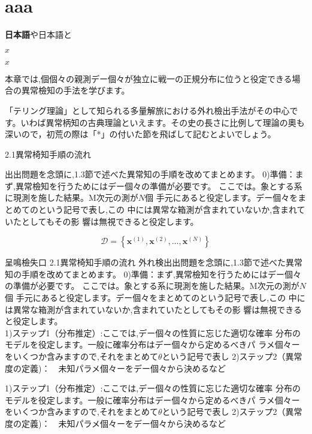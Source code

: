\documentclass{jarticle}
\begin{document}
\section{aaa}

\textbf{日本語}や{\Huge 日本語}と



\( x \)

$x$

\centering \Huge

本章では,個個々の親測デー個々が独立に戦一の正規分布に位うと役定できる場合の異常檢知の手法を学びます。

「テリング理論」として知られる多量解旅における外れ檢出手法がその中心です。いわば異常柄知の古典理論といえます。その史の長さに比例して理論の奧も深いので，初荒の際は「*」の付いた節を飛ばして記むとよいでしょう。


2.1異常椅知手順の流れ

出出問題を念頭に,1.3節で述べた異常知の手順を改めてまとめます。
0)準備：まず,異常檢知を行うためにはデー個々の準備が必要です。
ここでは。象とする系に現測を施した結果。M次元の測が$N$個
手元にあると役定します。デー個々をまとめてのという記号で表し,この
中には異常な箱測が含まれていないか,含まれていたとしてもその影
響は無視できると役定します。

$$
\mathcal{D}=\left\{\boldsymbol{x}^{(1)},\boldsymbol{x}^{(2)},\ldots,\boldsymbol{x}^{(N)}\right\}
$$


呈鳴檢失口
2.1異常椅知手順の流れ
外れ検出出問題を念頭に,1.3節で述べた異常知の手順を改めてまとめます。
0)準備：まず,異常檢知を行うためにはデー個々の準備が必要です。
ここでは。象とする系に現測を施した結果。M次元の測が$N$個
手元にあると役定します。デー個々をまとめてのという記号で表し,この
中には異常な箱測が含まれていないか,含まれていたとしてもその影
響は無視できると役定します。
$$
$$
1)ステップ1（分布推定）:ここでは,デー個々の性質に忘じた適切な確率
分布のモデルを役定します。一般に確率分布はデー個々から定めるべきパ
ラメ個々ーをいくつか含みますので,それをまとめて$\theta$という記号で表し
2)ステップ2（異常度の定義)：$\quad$未知パラメ個々ーをデー個々から決めるなど



1)ステップ1（分布推定）:ここでは,デー個々の性質に忘じた適切な確率
分布のモデルを役定します。一般に確率分布はデー個々から定めるべきパ
ラメ個々ーをいくつか含みますので,それをまとめて$\theta$という記号で表し
2)ステップ2（異常度の定義)：$\quad$未知パラメ個々ーをデー個々から決めるなど
\end{document}
